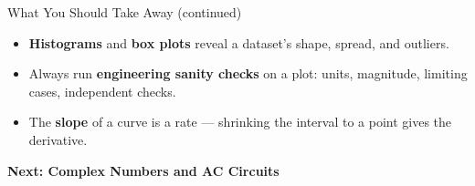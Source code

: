 \documentclass[9pt,aspectratio=169,xcolor=table]{beamer}
\begin{document}
\begin{frame}{What You Should Take Away (continued)}
    \leavevmode
    \small
    \begin{itemize}
        \item \textbf{Histograms} and \textbf{box plots} reveal a
              dataset's shape, spread, and outliers.
        \item Always run \textbf{engineering sanity checks} on a plot:
              units, magnitude, limiting cases, independent checks.
        \item The \textbf{slope} of a curve is a rate --- shrinking the
              interval to a point gives the derivative.
    \end{itemize}

    \vspace{4mm}
    \begin{center}
        \large\color{primary}\textbf{Next: Complex Numbers and AC Circuits}
    \end{center}
\end{frame}
\end{document}
